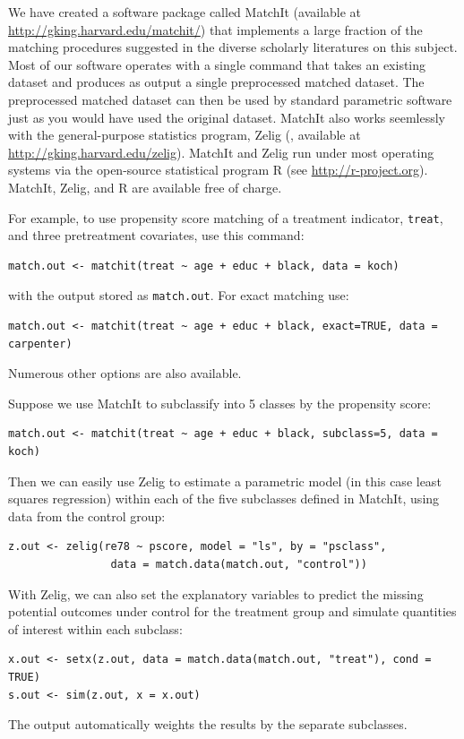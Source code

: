 \documentclass[11pt,titlepage]{article}
\begin{document}
We have created a software package called MatchIt (available at
\url{http://gking.harvard.edu/matchit/}) that implements a large
fraction of the matching procedures suggested in the diverse scholarly
literatures on this subject.  Most of our software operates with a
single command that takes an existing dataset and produces as output a
single preprocessed matched dataset.  The preprocessed matched dataset
can then be used by standard parametric software just as you would
have used the original dataset.  MatchIt also works seemlessly with
the general-purpose statistics program, Zelig (\citet{ImaKinLau04},
available at \url{http://gking.harvard.edu/zelig}).  MatchIt and Zelig
run under most operating systems via the open-source statistical
program R (see \url{http://r-project.org}).  MatchIt, Zelig, and R are
available free of charge.

For example, to use propensity score matching of a treatment
indicator, \texttt{treat}, and three pretreatment covariates, use this
command:
\begin{verbatim}
match.out <- matchit(treat ~ age + educ + black, data = koch)
\end{verbatim}
with the output stored as \texttt{match.out}.  For exact matching use:
\begin{verbatim}
match.out <- matchit(treat ~ age + educ + black, exact=TRUE, data = carpenter)
\end{verbatim}
Numerous other options are also available.

Suppose we use MatchIt to subclassify into 5 classes by the propensity
score:
\begin{verbatim}
match.out <- matchit(treat ~ age + educ + black, subclass=5, data = koch)
\end{verbatim}
Then we can easily use Zelig to estimate a parametric model (in this
case least squares regression) within each of the five subclasses
defined in MatchIt, using data from the control group:
\begin{verbatim}
z.out <- zelig(re78 ~ pscore, model = "ls", by = "psclass", 
                data = match.data(match.out, "control"))
\end{verbatim}
With Zelig, we can also set the explanatory variables to predict the
missing potential outcomes under control for the treatment group and
simulate quantities of interest within each subclass:
\begin{verbatim}
x.out <- setx(z.out, data = match.data(match.out, "treat"), cond = TRUE)
s.out <- sim(z.out, x = x.out)
\end{verbatim}
The output automatically weights the results by the separate subclasses.
\baselineskip 

\end{document}

